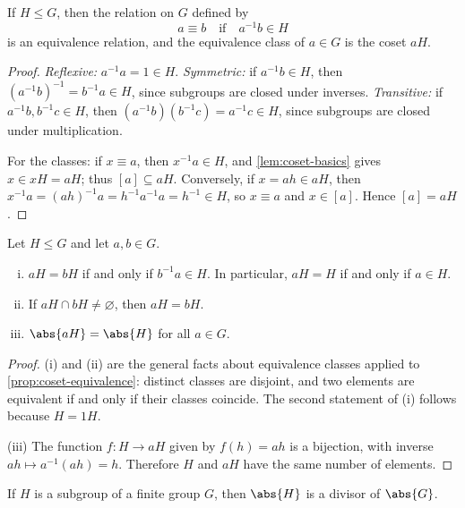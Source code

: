 \begin{proposition}\label{prop:coset-equivalence}
	If \(H \leq G\), then the relation on \(G\) defined by
	\[
		a \equiv b \quad\text{if}\quad a^{-1}b \in H
	\]
	is an equivalence relation, and the equivalence class of \(a \in G\) is the coset
	\(aH\).
\end{proposition}

\begin{proof}
	\emph{Reflexive:} \(a^{-1}a = 1 \in H\). \emph{Symmetric:} if \(a^{-1}b \in H\), then
	\((a^{-1}b)^{-1} = b^{-1}a \in H\), since subgroups are closed under inverses.
	\emph{Transitive:} if \(a^{-1}b, b^{-1}c \in H\), then
	\((a^{-1}b)(b^{-1}c) = a^{-1}c \in H\), since subgroups are closed under
	multiplication.

	For the classes: if \(x \equiv a\), then \(x^{-1}a \in H\), and
	\autoref{lem:coset-basics} gives \(x \in xH = aH\); thus \([a] \subseteq aH\).
	Conversely, if \(x = ah \in aH\), then
	\(x^{-1}a = (ah)^{-1}a = h^{-1}a^{-1}a = h^{-1} \in H\), so \(x \equiv a\) and
	\(x \in [a]\). Hence \([a] = aH\).
\end{proof}

\begin{lemma}\label{lem:coset-basics}
	Let \(H \leq G\) and let \(a, b \in G\).
	\begin{enumerate}[(i)]
		\item \(aH = bH\) if and only if \(b^{-1}a \in H\). In particular, \(aH = H\) if and
		      only if \(a \in H\).
		\item If \(aH \cap bH \neq \varnothing\), then \(aH = bH\).
		\item \(\abs{aH} = \abs{H}\) for all \(a \in G\).
	\end{enumerate}
\end{lemma}

\begin{proof}
	(i) and (ii) are the general facts about equivalence classes applied to
	\autoref{prop:coset-equivalence}: distinct classes are disjoint, and two
	elements are equivalent if and only if their classes coincide. The second statement of
	(i) follows because \(H = 1H\).

	(iii) The function \(f\colon H \to aH\) given by \(f(h) = ah\) is a bijection, with
	inverse \(ah \mapsto a^{-1}(ah) = h\). Therefore \(H\) and \(aH\) have the same number
	of elements.
\end{proof}

\begin{theorem}\label{thm:lagrange}
	If \(H\) is a subgroup of a finite group \(G\), then \(\abs{H}\) is a divisor of
	\(\abs{G}\).
\end{theorem}

